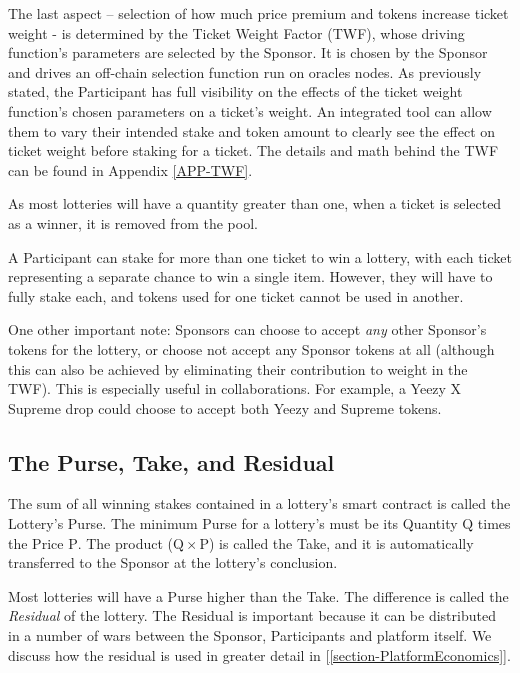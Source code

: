 \documentclass[runningheads]{llncs}
\begin{document}
The last aspect – selection of how much price premium and tokens increase ticket weight - is determined by the Ticket Weight Factor (TWF), whose driving function’s parameters are selected by the Sponsor.  It is chosen by the Sponsor and drives an off-chain selection function run on oracles nodes.  As previously stated, the Participant has full visibility on the effects of the ticket weight function’s chosen parameters on a ticket’s weight.  An integrated tool can allow them to vary their intended stake and token amount to clearly see the effect on ticket weight before staking for a ticket.  The details and math behind the TWF can be found in Appendix \ref{APP-TWF}.

As most lotteries will have a quantity greater than one, when a ticket is selected as a winner, it is removed from the pool.

A Participant can stake for more than one ticket to win a lottery, with each ticket representing a separate chance to win a single item.  However, they will have to fully stake each, and tokens used for one ticket cannot be used in another.

One other important note: Sponsors can choose to accept \emph{any} other Sponsor’s tokens for the lottery, or choose not accept any Sponsor tokens at all (although this can also be achieved by eliminating their contribution to weight in the TWF).  This is especially useful in collaborations.  For example, a Yeezy X Supreme drop could choose to accept both Yeezy and Supreme tokens.

\subsection{The Purse, Take, and Residual}\label{subsection-ThePurseLotteryValuedStaked}
The sum of all winning stakes contained in a lottery’s smart contract is called the Lottery’s Purse.  The minimum Purse for a lottery’s must be its Quantity $\mathrm{Q}$ times the Price $\mathrm{P}$.  The product ($\mathrm{Q} \times \mathrm{P}$) is called the Take, and it is automatically transferred to the Sponsor at the lottery’s conclusion.

Most lotteries will have a Purse higher than the Take.  The difference is called the \emph{Residual} of the lottery.  The Residual is important because it can be distributed in a number of wars between the Sponsor, Participants and platform itself.  We discuss how the residual is used in greater detail in [\ref{section-PlatformEconomics}].
\end{document}
